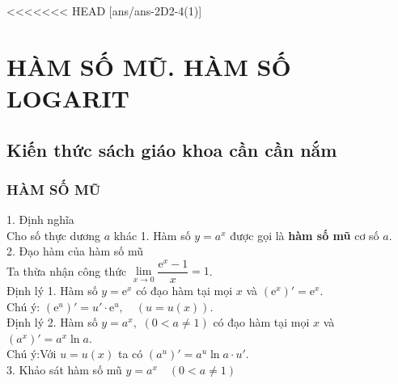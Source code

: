 <<<<<<< HEAD
[ans/ans-2D2-4(1)]
\section{HÀM SỐ MŨ. HÀM SỐ LOGARIT}
\subsection{Kiến thức sách giáo khoa cần cần nắm}
\subsubsection{HÀM SỐ MŨ}
1. Định nghĩa\\
Cho số thực dương $a$ khác 1.
Hàm số $y=a^x$ được gọi là \textbf{hàm số mũ} cơ số $a$.\\
2. Đạo hàm của hàm số mũ\\
Ta thừa nhận công thức \quad $\lim\limits_{x\to 0}\dfrac{\mathrm{e}^x-1}{x}=1$.\\
Định lý 1.
Hàm số $y=\mathrm{e}^x$ có đạo hàm tại mọi $x$ và $(\mathrm{e}^x)'=\mathrm{e}^x$.\\
Chú ý: $(\mathrm{e}^u)'=u'\cdot\mathrm{e}^u, \quad (u=u(x))$.\\
Định lý 2.
Hàm số $y=a^x,\,\,(0<a\neq 1)$ có đạo hàm tại mọi $x$ và $(a^x)'=a^x\ln a$.\\
Chú ý:\quad Với $u=u(x)$ ta có $(a^u)'=a^u \ln a\cdot u'$.\\
3. Khảo sát hàm số mũ \quad $y=a^x \quad (0<a \ne 1)$
